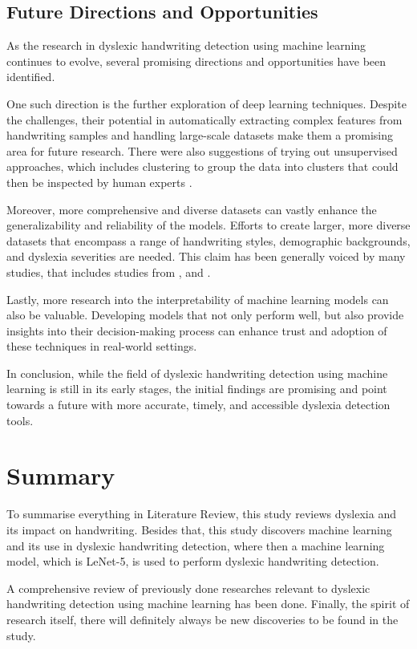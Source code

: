 \newpage
\subsection{Future Directions and Opportunities}
As the research in dyslexic handwriting detection using machine learning continues to evolve, several promising directions and opportunities have been identified.

One such direction is the further exploration of deep learning techniques. Despite the challenges, their potential in automatically extracting complex features from handwriting samples and handling large-scale datasets make them a promising area for future research. There were also suggestions of trying out unsupervised approaches, which includes clustering to group the data into clusters that could then be inspected by human experts \parencite{Spoon2019TowardsDD}.

Moreover, more comprehensive and diverse datasets can vastly enhance the generalizability and reliability of the models. Efforts to create larger, more diverse datasets that encompass a range of handwriting styles, demographic backgrounds, and dyslexia severities are needed. This claim has been generally voiced by many studies, that includes studies from \textcite{Isa2019AutomatedDO}, \textcite{Richard2020DyslexiaAD} and \textcite{Usman2021AdvanceML}.

Lastly, more research into the interpretability of machine learning models can also be valuable. Developing models that not only perform well, but also provide insights into their decision-making process can enhance trust and adoption of these techniques in real-world settings.

In conclusion, while the field of dyslexic handwriting detection using machine learning is still in its early stages, the initial findings are promising and point towards a future with more accurate, timely, and accessible dyslexia detection tools.\\

\newpage
\section{Summary}
To summarise everything in Literature Review, this study reviews dyslexia and its impact on handwriting. Besides that, this study discovers machine learning and its use in dyslexic handwriting detection, where then a machine learning model, which is LeNet-5, is used to perform dyslexic handwriting detection. 

A comprehensive review of previously done researches relevant to dyslexic handwriting detection using machine learning has been done. Finally, the spirit of research itself, there will definitely always be new discoveries to be found in the study. 